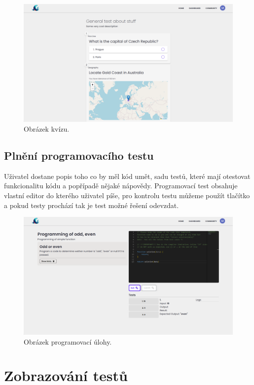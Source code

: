 \documentclass[12pt, a4paper,
openright
]{report}
\begin{document}
\begin{figure}[H]
	\centering %
	\includegraphics[width=0.75\linewidth]{image/test-taking.png} 
	\caption{Obrázek kvízu.} %
	\label{fig:test-taking} %
\end{figure}

\subsection{Plnění programovacího testu}
Uživatel dostane popis toho co by měl kód umět, sadu testů, které mají otestovat funkcionalitu kódu a popřípadě nějaké nápovědy. Programovací test obsahuje vlastní editor do kterého uživatel píše, pro kontrolu testu můžeme použít tlačítko \textit{} a pokud testy prochází tak je test možné řešení odevzdat.

\begin{figure}[H]
	\centering %
	\includegraphics[width=0.75\linewidth]{image/programming.png} 
	\caption{Obrázek programovací úlohy.} %
	\label{fig:programming} %
\end{figure}

\clearpage
\section{Zobrazování testů}
\end{document}
